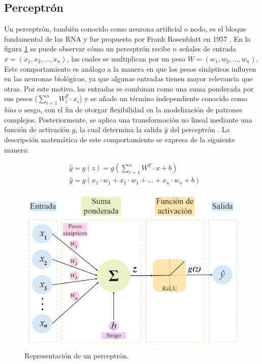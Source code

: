 \subsection{Perceptrón}
Un perceptrón, también conocido como neurona artificial o nodo, es el bloque fundamental de las 
RNA y fue propuesto por Frank Rosenblatt en 1957 \citep{CITE:43}. En la figura \ref{fig:Perceptron} se puede observar 
cómo un perceptrón recibe $n$ señales de entrada $x = (x_1, x_2, …, x_n)$, las cuales se multiplican 
por un peso $W = (w_1, w_2, …, w_n)$. Este comportamiento es análogo a la manera en que los 
pesos sinápticos influyen en las neuronas biológicas, ya que algunas entradas tienen mayor relevancia 
que otras. Por este motivo, las entradas se combinan como una suma ponderada por sus pesos 
($\sum_{i=1}^{n} W_i^T \cdot x_i$) y se añade un término independiente conocido como \emph{bias} o 
sesgo, con el fin de otorgar flexibilidad en la modelización de patrones complejos. 
Posteriormente, se aplica una transformación no lineal mediante una función de activación $g$, 
la cual determina la salida $\hat{y}$ del perceptrón \citep{CITE:35} \citep{CITE:42}. 
La descripción matemática de este comportamiento se expresa de la siguiente manera: 

\begin{equation}\label{eq:perceptron}
\begin{split}
	&\hat{y} = g(z) = g( \sum_{i=1}^{n} W^T \cdot x + b) \\
				&\hat{y} = g(x_1 \cdot w_1 + x_1 \cdot w_1 + … + x_n \cdot w_n + b)
\end{split}
\end{equation}

\begin{figure}[h!]
	\centering
	\includegraphics[width=\textwidth]{./Figures/Perceptron.jpg}
	\caption{Representación de un perceptrón\protect\footnotemark.}
	\label{fig:Perceptron}
\end{figure}


